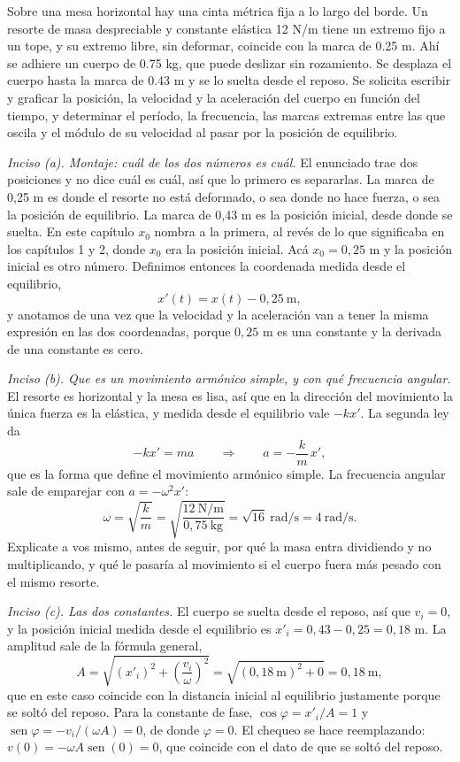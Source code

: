 \documentclass[11pt,openany]{book}
\newcommand{\sen}{\operatorname{sen}}
\begin{document}
\begin{ejemplo}[completo]
Sobre una mesa horizontal hay una cinta métrica fija a lo largo del borde. Un resorte de masa despreciable y constante elástica 12 N/m tiene un extremo fijo a un tope, y su extremo libre, sin deformar, coincide con la marca de 0.25 m. Ahí se adhiere un cuerpo de 0.75 kg, que puede deslizar sin rozamiento. Se desplaza el cuerpo hasta la marca de 0.43 m y se lo suelta desde el reposo. Se solicita escribir y graficar la posición, la velocidad y la aceleración del cuerpo en función del tiempo, y determinar el período, la frecuencia, las marcas extremas entre las que oscila y el módulo de su velocidad al pasar por la posición de equilibrio.

\medskip
\textit{Inciso (a). Montaje: cuál de los dos números es cuál.} El enunciado trae dos posiciones y no dice cuál es cuál, así que lo primero es separarlas. La marca de 0,25 m es donde el resorte no está deformado, o sea donde no hace fuerza, o sea la posición de equilibrio. La marca de 0,43 m es la posición inicial, desde donde se suelta. En este capítulo $x_0$ nombra a la primera, al revés de lo que significaba en los capítulos 1 y 2, donde $x_0$ era la posición inicial. Acá $x_0 = 0{,}25$ m y la posición inicial es otro número. Definimos entonces la coordenada medida desde el equilibrio,
\[
x'(t) = x(t) - 0{,}25\ \mathrm{m} ,
\]
y anotamos de una vez que la velocidad y la aceleración van a tener la misma expresión en las dos coordenadas, porque $0{,}25$ m es una constante y la derivada de una constante es cero.

\medskip
\textit{Inciso (b). Que es un movimiento armónico simple, y con qué frecuencia angular.} El resorte es horizontal y la mesa es lisa, así que en la dirección del movimiento la única fuerza es la elástica, y medida desde el equilibrio vale $-kx'$. La segunda ley da
\[
-k x' = m a
\qquad\Longrightarrow\qquad
a = -\frac{k}{m}\,x' ,
\]
que es la forma que define el movimiento armónico simple. La frecuencia angular sale de emparejar con $a = -\omega^2 x'$:
\[
\omega = \sqrt{\frac{k}{m}} = \sqrt{\frac{12\ \mathrm{N/m}}{0{,}75\ \mathrm{kg}}} = \sqrt{16}\ \mathrm{rad/s} = 4\ \mathrm{rad/s} .
\]
Explicate a vos mismo, antes de seguir, por qué la masa entra dividiendo y no multiplicando, y qué le pasaría al movimiento si el cuerpo fuera más pesado con el mismo resorte.

\medskip
\textit{Inciso (c). Las dos constantes.} El cuerpo se suelta desde el reposo, así que $v_i = 0$, y la posición inicial medida desde el equilibrio es $x'_i = 0{,}43 - 0{,}25 = 0{,}18$ m. La amplitud sale de la fórmula general,
\[
A = \sqrt{(x'_i)^{2} + \left(\frac{v_i}{\omega}\right)^{2}} = \sqrt{(0{,}18\ \mathrm{m})^{2} + 0} = 0{,}18\ \mathrm{m} ,
\]
que en este caso coincide con la distancia inicial al equilibrio justamente porque se soltó del reposo. Para la constante de fase, $\cos\varphi = x'_i/A = 1$ y $\sen\varphi = -v_i/(\omega A) = 0$, de donde $\varphi = 0$. El chequeo se hace reemplazando: $v(0) = -\omega A \sen(0) = 0$, que coincide con el dato de que se soltó del reposo.


\end{ejemplo}
\end{document}
